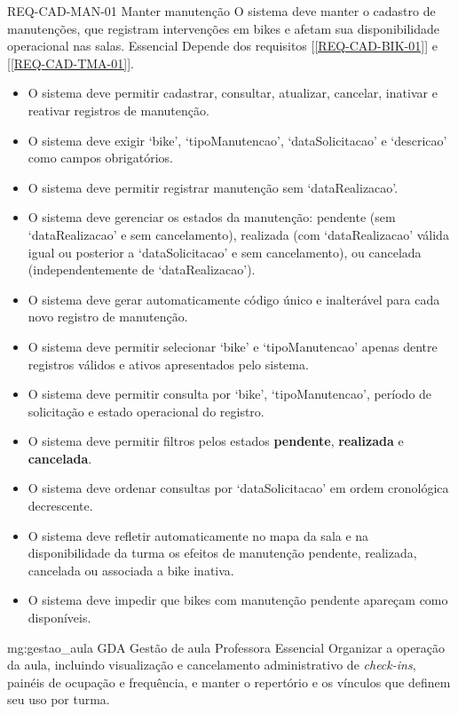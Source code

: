 
\reqfunccad
{REQ-CAD-MAN-01 Manter manutenção}
{O sistema deve manter o cadastro de manutenções, que registram intervenções em bikes e afetam sua disponibilidade operacional nas salas.}
{Essencial}
{Depende dos requisitos [\ref{REQ-CAD-BIK-01}] e [\ref{REQ-CAD-TMA-01}].}
{\begin{itemize}[leftmargin=0.6cm]
    \item O sistema deve permitir cadastrar, consultar, atualizar, cancelar, inativar e reativar registros de manutenção.
    \item O sistema deve exigir `bike', `tipoManutencao', `dataSolicitacao' e `descricao' como campos obrigatórios.
    \item O sistema deve permitir registrar manutenção sem `dataRealizacao'.
    \item O sistema deve gerenciar os estados da manutenção: pendente (sem `dataRealizacao' e sem cancelamento), realizada (com `dataRealizacao' válida igual ou posterior a `dataSolicitacao' e sem cancelamento), ou cancelada (independentemente de `dataRealizacao').
    \item O sistema deve gerar automaticamente código único e inalterável para cada novo registro de manutenção.
    \item O sistema deve permitir selecionar `bike' e `tipoManutencao' apenas dentre registros válidos e ativos apresentados pelo sistema.
    \item O sistema deve permitir consulta por `bike', `tipoManutencao', período de solicitação e estado operacional do registro.
    \item O sistema deve permitir filtros pelos estados \textbf{pendente}, \textbf{realizada} e \textbf{cancelada}.
    \item O sistema deve ordenar consultas por `dataSolicitacao' em ordem cronológica decrescente.
    \item O sistema deve refletir automaticamente no mapa da sala e na disponibilidade da turma os efeitos de manutenção pendente, realizada, cancelada ou associada a bike inativa.
    \item O sistema deve impedir que bikes com manutenção pendente apareçam como disponíveis.
\end{itemize}}

\rfmacrogrupo
{mg:gestao_aula}
{GDA}
{Gestão de aula}
{Professora}
{Essencial}
{Organizar a operação da aula, incluindo visualização e cancelamento administrativo de \textit{check-ins}, painéis de ocupação e frequência, e manter o repertório e os vínculos que definem seu uso por turma.}

